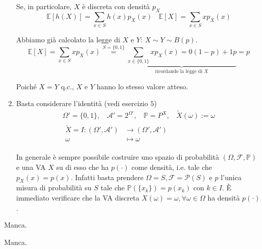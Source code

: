 \begin{enumerate}
\begin{theorem}
Se, in particolare, $X$ è discreta con densità $p_{X}$\begin{equation*}
\mathbb{E}[ h( X)] =\sum\limits _{x\in S} h( x) p_{X}( x) \ \ \ \ \mathbb{E}[ X] =\sum\limits _{x\in S} xp_{X}( x)
\end{equation*}
\end{theorem}

Abbiamo già calcolato la legge di $X$ e $Y$: $X\sim Y\sim B( p)$.\begin{equation*}
\mathbb{E}[ X] =\sum\limits _{x\in S} xp_{X}( x)\overset{S=\{0,1\}}{=}\underbrace{\sum\limits _{x\in \{0,1\}} xp_{X}( x) =0( 1-p) +1p}_{\text{ricordando la legge di } X} =p
\end{equation*}

Poiché $X=Y$ q.c., $X$ e $Y$ hanno lo stesso valore atteso.
\item Basta considerare l'identità (vedi esercizio $5$)\begin{gather*}
\Omega '=\{0,1\} ,\ \ \ \ \mathcal{A} '=2^{\Omega '} ,\ \ \ \ \mathbb{P} =P^{X} ,\ \ \ \ \tilde{X}( \omega ) :=\omega \\
\begin{aligned}
\tilde{X} =I:( \Omega ',\mathcal{A} ') & \rightarrow ( \Omega ',\mathcal{A} ')\\
\omega  & \mapsto \omega 
\end{aligned}
\end{gather*}

\begin{oss}
In generale è sempre possibile costruire uno spazio di probabilità $( \Omega ,\mathcal{F} ,\mathbb{P})$ e una VA $X$ su di esso che ha $p( \cdotp )$ come densità, i.e. tale che $p_{X}( x) =p( x)$. Infatti basta prendere $\Omega =S,\mathcal{F} =\mathcal{P}( S)$ e $p$ l'unica misura di probabilità su $S$ tale che $\mathbb{P}(\{x_{k}\}) =p( x_{k})$ con $k\in I$. È immediato verificare che la VA discreta $X( \omega ) =\omega ,\forall \omega \in \Omega $ ha densità $p( \cdotp )$.
\end{oss}
\end{enumerate}
\Soluzione

Manca.
\Soluzione

Manca.
\Soluzione

